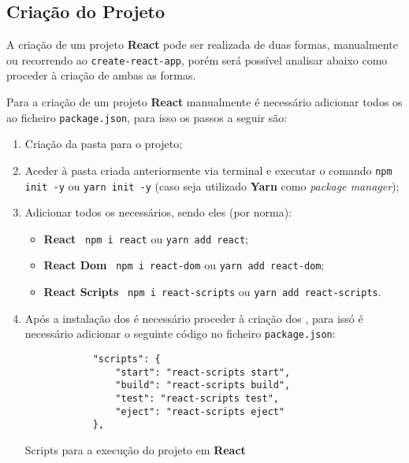 \subsection{Criação do Projeto}

A criação de um projeto \textbf{React} pode ser realizada de duas formas, manualmente ou recorrendo ao \texttt{create-react-app}, porém será possível analisar abaixo como proceder à criação de ambas as formas.

Para a criação de um projeto \textbf{React} manualmente é necessário adicionar todos os \textit{} ao ficheiro \texttt{package.json}, para isso os passos a seguir são:

\begin{enumerate}
	\item Criação da pasta para o projeto;
	\item Aceder à pasta criada anteriormente via terminal e executar o comando \texttt{npm init -y} ou \texttt{yarn init -y} {\scriptsize (caso seja utilizado \textbf{Yarn} como \textit{package manager})};
	\item Adicionar todos os \textit{} necessários, sendo eles {\scriptsize (por norma)}:
	\begin{itemize}
		\item \textbf{React} \textemdash~\texttt{npm i react} ou \texttt{yarn add react};
		\item \textbf{React Dom} \textemdash~\texttt{npm i react-dom} ou \texttt{yarn add react-dom};
		\item \textbf{React Scripts} \textemdash~\texttt{npm i react-scripts} ou \texttt{yarn add react-scripts}.
	\end{itemize}
	\item Após a instalação dos \textit{} é necessário proceder à criação dos \textit{}, para issó é necessário adicionar o seguinte código no ficheiro \texttt{package.json}:

	\begin{longlisting}
		\begin{verbatim}
			"scripts": {
				"start": "react-scripts start",
				"build": "react-scripts build",
				"test": "react-scripts test",
				"eject": "react-scripts eject"
			},
		\end{verbatim}
		\caption{Scripts para a execução do projeto em \textbf{React}}
	\end{longlisting}


\end{enumerate}
